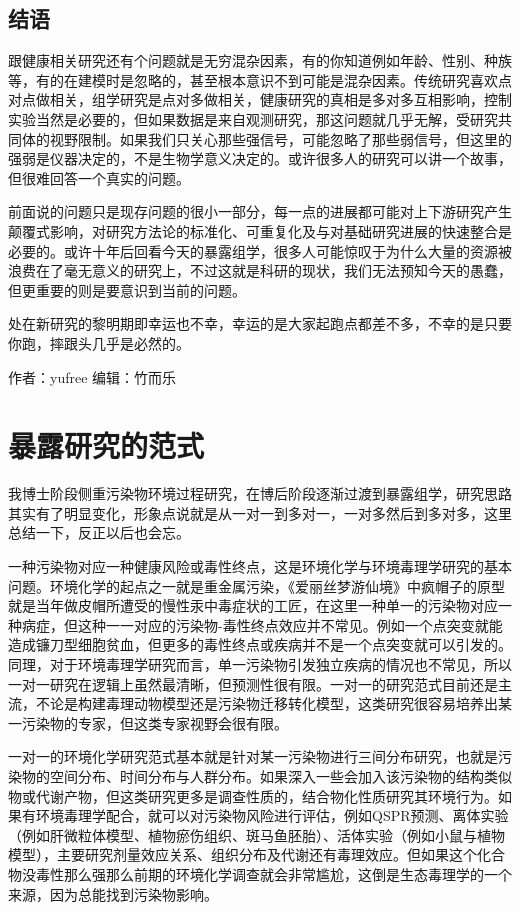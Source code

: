 \documentclass[]{book}
\begin{document}
\hypertarget{ux7ed3ux8bed-4}{%
\subsection{结语}\label{ux7ed3ux8bed-4}}

跟健康相关研究还有个问题就是无穷混杂因素，有的你知道例如年龄、性别、种族等，有的在建模时是忽略的，甚至根本意识不到可能是混杂因素。传统研究喜欢点对点做相关，组学研究是点对多做相关，健康研究的真相是多对多互相影响，控制实验当然是必要的，但如果数据是来自观测研究，那这问题就几乎无解，受研究共同体的视野限制。如果我们只关心那些强信号，可能忽略了那些弱信号，但这里的强弱是仪器决定的，不是生物学意义决定的。或许很多人的研究可以讲一个故事，但很难回答一个真实的问题。

前面说的问题只是现存问题的很小一部分，每一点的进展都可能对上下游研究产生颠覆式影响，对研究方法论的标准化、可重复化及与对基础研究进展的快速整合是必要的。或许十年后回看今天的暴露组学，很多人可能惊叹于为什么大量的资源被浪费在了毫无意义的研究上，不过这就是科研的现状，我们无法预知今天的愚蠢，但更重要的则是要意识到当前的问题。

处在新研究的黎明期即幸运也不幸，幸运的是大家起跑点都差不多，不幸的是只要你跑，摔跟头几乎是必然的。

作者：yufree
编辑：竹而乐

\hypertarget{ux66b4ux9732ux7814ux7a76ux7684ux8303ux5f0f}{%
\section{暴露研究的范式}\label{ux66b4ux9732ux7814ux7a76ux7684ux8303ux5f0f}}

我博士阶段侧重污染物环境过程研究，在博后阶段逐渐过渡到暴露组学，研究思路其实有了明显变化，形象点说就是从一对一到多对一，一对多然后到多对多，这里总结一下，反正以后也会忘。

一种污染物对应一种健康风险或毒性终点，这是环境化学与环境毒理学研究的基本问题。环境化学的起点之一就是重金属污染，《爱丽丝梦游仙境》中疯帽子的原型就是当年做皮帽所遭受的慢性汞中毒症状的工匠，在这里一种单一的污染物对应一种病症，但这种一一对应的污染物-毒性终点效应并不常见。例如一个点突变就能造成镰刀型细胞贫血，但更多的毒性终点或疾病并不是一个点突变就可以引发的。同理，对于环境毒理学研究而言，单一污染物引发独立疾病的情况也不常见，所以一对一研究在逻辑上虽然最清晰，但预测性很有限。一对一的研究范式目前还是主流，不论是构建毒理动物模型还是污染物迁移转化模型，这类研究很容易培养出某一污染物的专家，但这类专家视野会很有限。

一对一的环境化学研究范式基本就是针对某一污染物进行三间分布研究，也就是污染物的空间分布、时间分布与人群分布。如果深入一些会加入该污染物的结构类似物或代谢产物，但这类研究更多是调查性质的，结合物化性质研究其环境行为。如果有环境毒理学配合，就可以对污染物风险进行评估，例如QSPR预测、离体实验（例如肝微粒体模型、植物瘀伤组织、斑马鱼胚胎）、活体实验（例如小鼠与植物模型），主要研究剂量效应关系、组织分布及代谢还有毒理效应。但如果这个化合物没毒性那么强那么前期的环境化学调查就会非常尴尬，这倒是生态毒理学的一个来源，因为总能找到污染物影响。
\end{document}
